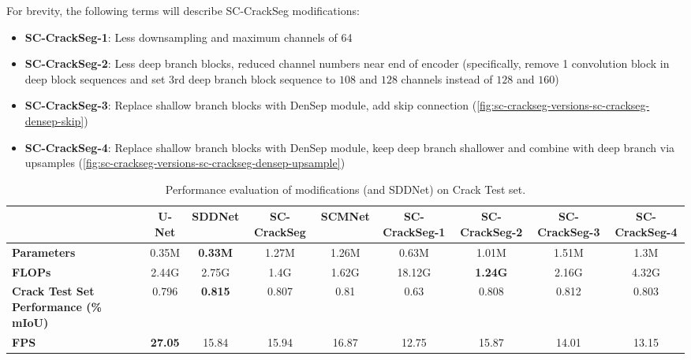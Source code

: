 \documentclass[a4paper,12pt]{report}
\begin{document}
For brevity, the following terms will describe SC-CrackSeg modifications:
\begin{itemize}
    \item \textbf{SC-CrackSeg-1}: Less downsampling and maximum channels of 64
    \item \textbf{SC-CrackSeg-2}: Less deep branch blocks, reduced channel numbers near end of encoder (specifically, remove 1 convolution block in deep block sequences and set 3rd deep branch block sequence to $108$ and $128$ channels instead of $128$ and $160$)
    \item \textbf{SC-CrackSeg-3}: Replace shallow branch blocks with DenSep module, add skip connection (\autoref{fig:sc-crackseg-versions-sc-crackseg-densep-skip})
    \item \textbf{SC-CrackSeg-4}: Replace shallow branch blocks with DenSep module, keep deep branch shallower and combine with deep branch via upsamples (\autoref{fig:sc-crackseg-versions-sc-crackseg-densep-upsample})
\end{itemize}

\begin{table}[htbp]
    \begin{adjustbox}{width=\columnwidth,center}
        \begin{tabular}{|p{}|c|c|c|c|c|c|c|c|}
            \hline
                                                          & \textbf{U-Net} & \textbf{SDDNet} & \textbf{SC-CrackSeg} & \textbf{SCMNet} & \textbf{SC-CrackSeg-1} & \textbf{SC-CrackSeg-2} & \textbf{SC-CrackSeg-3} & \textbf{SC-CrackSeg-4} \\
            \hline
            \textbf{Parameters}                           & 0.35M          & \textbf{0.33M}  & 1.27M                & 1.26M           & 0.63M                  & 1.01M                  & 1.51M                  & 1.3M                   \\
            \hline
            \textbf{FLOPs}                                & 2.44G          & 2.75G           & 1.4G                 & 1.62G           & 18.12G                 & \textbf{1.24G}         & 2.16G                  & 4.32G                  \\
            \hline
            \textbf{Crack Test Set Performance (\% mIoU)} & 0.796          & \textbf{0.815}  & 0.807                & 0.81            & 0.63                   & 0.808                  & 0.812                  & 0.803                  \\
            \hline
            \textbf{FPS}                                  & \textbf{27.05} & 15.84           & 15.94                & 16.87           & 12.75                  & 15.87                  & 14.01                  & 13.15                  \\
            \hline
        \end{tabular}
    \end{adjustbox}
    \caption{Performance evaluation of modifications (and SDDNet) on Crack Test set.}%
    \label{}
\end{table}
\end{document}

